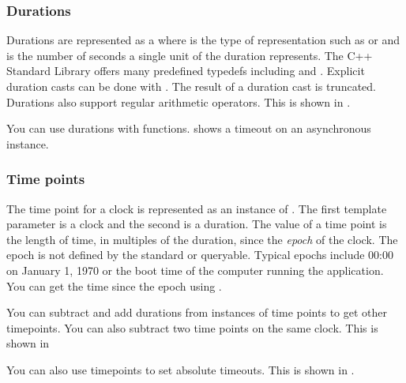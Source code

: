 \subsubsection{Durations}
Durations are represented as a  where  is the type of representation such as  or  and  is the number of seconds a single unit of the duration represents. The C++ Standard Library offers many predefined typedefs including  and . Explicit duration casts can be done with . The result of a duration cast is truncated. Durations also support regular arithmetic operators. This is shown in .


You can use durations with  functions.  shows a timeout on an asynchronous instance.


\subsubsection{Time points}
The time point for a clock is represented as an instance of . The first template parameter is a clock and the second is a duration. The value of a time point is the length of time, in multiples of the duration, since the \emph{epoch} of the clock. The epoch is not defined by the standard or queryable. Typical epochs include 00:00 on January 1, 1970 or the boot time of the computer running the application. You can get the time since the epoch using .

You can subtract and add durations from instances of time points to get other timepoints. You can also subtract two time points on the same clock. This is shown in 


You can also use timepoints to set absolute timeouts. This is shown in .


